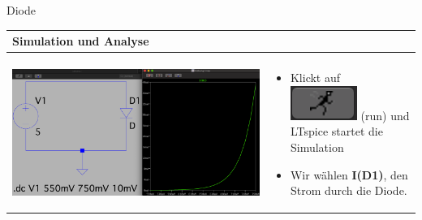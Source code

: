      \begin{frame}[t]{Diode}
    
      \begin{spacing}{0.9} \begin{tiny}
      \begin{table}[h!]
        \begin{tabular}{p{5cm} p{5cm}}
          \hline
          \textbf{Simulation und Analyse} & \\
          \hline \\
          \begin{minipage}{.5\textwidth}
            \includegraphics[width=\linewidth]{pictures/analysis_2.png}
          \end{minipage} 
          & 
          \begin{minipage}{.5\textwidth}
          \begin{itemize}
            \item Klickt auf \includegraphics[scale=0.3]{pictures/run.png} (run) und LTspice startet die Simulation
          \item Wir wählen \textbf{I(D1)}, den Strom durch die Diode.
          \end{itemize}
          \end{minipage} 
          \\
        \end{tabular}
      \end{table}
    \end{tiny} \end{spacing}
    

\end{frame}
